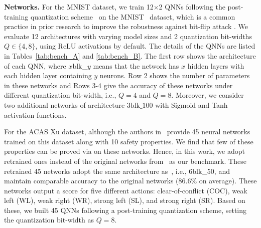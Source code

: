 \smallskip
\noindent
{\bf Networks.} For the MNIST dataset, we train 12$\times$2 QNNs following the post-training quantization scheme~\cite{gholami2021survey,li2024investigating} on the MNIST~\cite{MNIST} dataset, which is a common practice in prior research to improve the robustness against bit-flip attack \cite{HARDeNN,randomDNN}. We evaluate 12 architectures with varying model sizes and 2 quantization bit-widths $Q\in\{4,8\}$, using ReLU activations by default. The details of the QNNs are listed in Tables~\ref{tab:bench_A} and \ref{tab:bench_B}. The first row shows the architecture of each QNN, where $x$blk\_$y$ means that the network has $x$ hidden layers with each hidden layer containing $y$ neurons. Row 2 shows the number of parameters in these networks and Rows 3-4 give the accuracy of these networks under different quantization bit-width, i.e., $Q=4$ and $Q=8$.
Moreover, we consider two additional networks of architecture $3\text{blk}\_100$ with Sigmoid and Tanh activation functions.

For the ACAS Xu dataset, although the authors in~\cite{KBDJK17} provide 45 neural networks trained on this dataset along with 10 safety properties. We find that few of these properties can be proved via \deepPoly on these networks. Hence, in this work, we adopt retrained ones instead of the original networks from~\cite{longNew} as our benchmark. These retrained 45 networks adopt the same architecture as~\cite{KBDJK17}, i.e., 6blk\_50, and maintain comparable accuracy to the original networks (86.6\% on average). These networks output a score for five different actions: clear-of-conflict (COC), weak left (WL), weak right (WR), strong left (SL), and strong right (SR). Based on these, we built 45 QNNs following a post-training quantization scheme, setting the quantization bit-width as $Q=8$.


